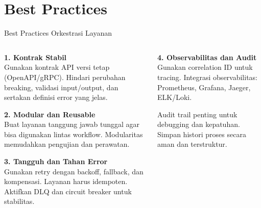 \documentclass[aspectratio=169, table]{beamer}
\begin{document}
\section{Best Practices}
\begin{frame}[fragile]{Best Practices Orkestrasi Layanan}
	\vspace{10pt}
	\begin{columns}[T]
		\begin{column}{0.58\textwidth}
			\textbf{1. Kontrak Stabil} \\
			Gunakan kontrak API versi tetap (OpenAPI/gRPC). Hindari perubahan breaking, validasi input/output, dan sertakan definisi error yang jelas.
			
			\vspace{6pt}
			\textbf{2. Modular dan Reusable} \\
			Buat layanan tanggung jawab tunggal agar bisa digunakan lintas workflow. Modularitas memudahkan pengujian dan perawatan.
			
			\vspace{6pt}
			\textbf{3. Tangguh dan Tahan Error} \\
			Gunakan retry dengan backoff, fallback, dan kompensasi. Layanan harus idempoten. Aktifkan DLQ dan circuit breaker untuk stabilitas.
		\end{column}
		
		\begin{column}{0.42\textwidth}
			\textbf{4. Observabilitas dan Audit} \\
			Gunakan correlation ID untuk tracing. Integrasi observabilitas: Prometheus, Grafana, Jaeger, ELK/Loki.
			
			\vspace{6pt}
			Audit trail penting untuk debugging dan kepatuhan. Simpan histori proses secara aman dan terstruktur.
			
		\end{column}
	\end{columns}
\end{frame}
\end{document}
